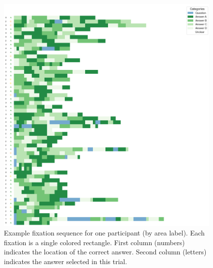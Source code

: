 \documentclass{article}
\begin{document}
\begin{appendices}
    \begin{figure}[H]
      \centering
      \includegraphics[width=1\textwidth]{plots/random_p_by_lbl.png}
      \caption{Example fixation sequence for one participant (by area label). Each fixation is a single colored rectangle. First column (numbers) indicates the location of the correct answer. Second column (letters) indicates the answer selected in this trial.}
      \label{fig:fixseq2}
    \end{figure}



\end{appendices}
\end{document}
